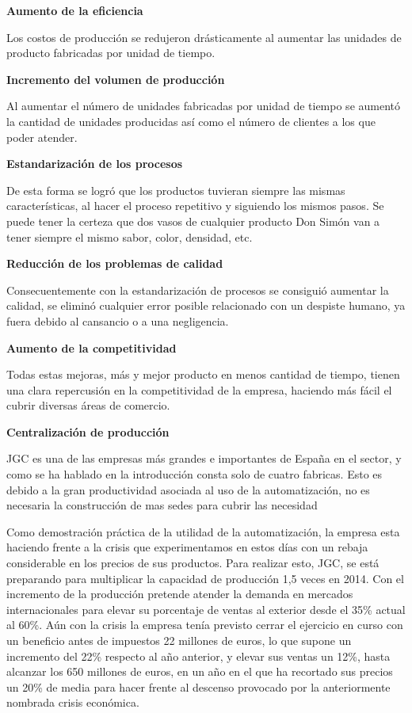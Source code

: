 \documentclass[11pt,a4paper,spanish,twoside]{report}
\begin{document}
\begin{description}
\item \textbf{Aumento de la eficiencia}

Los costos de producción se redujeron drásticamente al aumentar las
unidades de producto fabricadas por unidad de tiempo. 

\item \textbf{Incremento del volumen de producción}

Al aumentar el número de unidades fabricadas por unidad de tiempo se aumentó
la cantidad de unidades producidas así como el número de clientes a los que
poder atender.

\item \textbf{Estandarización de los procesos}

De esta forma se logró que los productos tuvieran siempre las mismas
características, al hacer el proceso repetitivo y siguiendo los mismos
pasos. Se puede tener la certeza que dos vasos de cualquier producto Don
Simón van a tener siempre el mismo sabor, color, densidad, etc.

\item \textbf{Reducción de los problemas de calidad}

Consecuentemente con la estandarización de procesos se consiguió aumentar la
calidad, se eliminó cualquier error posible relacionado con un despiste
humano, ya fuera debido al cansancio o a una negligencia. 

\item \textbf{Aumento de la competitividad}

Todas estas mejoras, más y mejor producto en menos cantidad de
tiempo, tienen una clara repercusión en la competitividad de la empresa,
haciendo más fácil el cubrir diversas áreas de comercio. 

\item \textbf{Centralización de producción}

JGC es una de las empresas más grandes e importantes de España en el sector,
y como se ha hablado en la introducción consta solo de cuatro fabricas. Esto
es debido a la gran productividad asociada al uso de la automatización, no es
necesaria la construcción de mas sedes para cubrir las necesidad

\end{description}

Como demostración práctica de la utilidad de la automatización, la empresa
esta haciendo frente a la crisis que experimentamos en estos días con un
rebaja considerable en los precios de sus productos. Para realizar esto, JGC,
se está preparando para multiplicar la capacidad de producción 1,5 veces en
2014. Con el incremento de la producción pretende atender la demanda en
mercados internacionales para elevar su porcentaje de ventas al exterior
desde el 35\% actual al 60\%. Aún con la crisis la empresa tenía previsto
cerrar el ejercicio en curso con un beneficio antes de impuestos 22 millones
de euros, lo que supone un incremento del 22\% respecto al año anterior, y
elevar sus ventas un 12\%, hasta alcanzar los 650 millones de euros, en un
año en el que ha recortado sus precios un 20\% de media para hacer frente al
descenso provocado por la anteriormente nombrada crisis económica.

 

\end{document}
